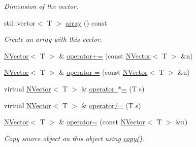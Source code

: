 \begin{DoxyCompactItemize}
\begin{DoxyCompactList}\small\item\em Dimension of the vector. \end{DoxyCompactList}\item 
std\+::vector$<$ T $>$ \mbox{\hyperlink{class_n_vector_aa99d9fea7e30357df42f736013506fe1}{array}} () const
\begin{DoxyCompactList}\small\item\em Create an array with {\ttfamily this} vector. \end{DoxyCompactList}\item 
\mbox{\hyperlink{class_n_vector}{N\+Vector}}$<$ T $>$ \& \mbox{\hyperlink{class_n_vector_a493c3ac08bab3361ad475fc0360ee489}{operator+=}} (const \mbox{\hyperlink{class_n_vector}{N\+Vector}}$<$ T $>$ \&u)
\item 
\mbox{\hyperlink{class_n_vector}{N\+Vector}}$<$ T $>$ \& \mbox{\hyperlink{class_n_vector_af402cb6a52bf52d08286cfa8edb6afaa}{operator-\/=}} (const \mbox{\hyperlink{class_n_vector}{N\+Vector}}$<$ T $>$ \&u)
\item 
virtual \mbox{\hyperlink{class_n_vector}{N\+Vector}}$<$ T $>$ \& \mbox{\hyperlink{class_n_vector_a1630b8394837cf1ddf808f2761136771}{operator $\ast$=}} (T s)
\item 
virtual \mbox{\hyperlink{class_n_vector}{N\+Vector}}$<$ T $>$ \& \mbox{\hyperlink{class_n_vector_ac6dc40f82bad305c159643de675e7395}{operator/=}} (T s)
\item 
\mbox{\hyperlink{class_n_vector}{N\+Vector}}$<$ T $>$ \& \mbox{\hyperlink{class_n_vector_ab793bf6d3d3fc05f91f435c1c0a8e5ea}{operator=}} (const \mbox{\hyperlink{class_n_vector}{N\+Vector}}$<$ T $>$ \&u)
\begin{DoxyCompactList}\small\item\em Copy source object on this object using {\ttfamily \mbox{\hyperlink{class_n_vector_a67128d2ff536b8ccd7a95cb680bd0431}{copy()}}}. \end{DoxyCompactList}\end{DoxyCompactItemize}
